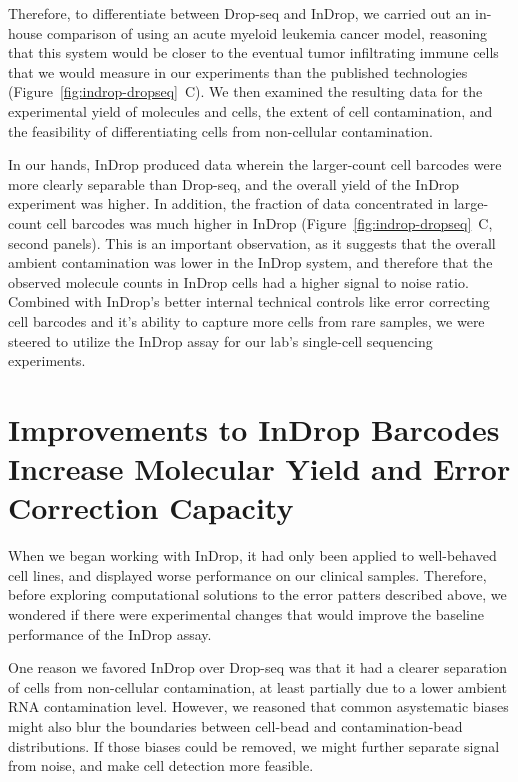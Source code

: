 Therefore, to differentiate between Drop-seq and InDrop, we carried out an in-house comparison of using an acute myeloid leukemia cancer model, reasoning that this system would be closer to the eventual tumor infiltrating immune cells that we would measure in our experiments than the published technologies (Figure~\ref{fig:indrop-dropseq}~C). 
We then examined the resulting data for the experimental yield of molecules and cells, the extent of cell contamination, and the feasibility of differentiating cells from non-cellular contamination. 

In our hands, InDrop produced data wherein the larger-count cell barcodes were more clearly separable than Drop-seq, and the overall yield of the InDrop experiment was higher.
In addition, the fraction of data concentrated in large-count cell barcodes was much higher in InDrop (Figure~\ref{fig:indrop-dropseq}~C, second panels). 
This is an important observation, as it suggests that the overall ambient contamination was lower in the InDrop system, and therefore that the observed molecule counts in InDrop cells had a higher signal to noise ratio. 
Combined with InDrop's better internal technical controls like error correcting cell barcodes and it's ability to capture more cells from rare samples, we were steered to utilize the InDrop assay for our lab's single-cell sequencing experiments.  

\section{Improvements to InDrop Barcodes Increase Molecular Yield and Error Correction Capacity}

When we began working with InDrop, it had only been applied to well-behaved cell lines, and displayed worse performance on our clinical samples. 
Therefore, before exploring computational solutions to the error patters described above, we wondered if there were experimental changes that would improve the baseline performance of the InDrop assay. 

One reason we favored InDrop over Drop-seq was that it had a clearer separation of cells from non-cellular contamination, at least partially due to a lower ambient RNA contamination level. 
However, we reasoned that common asystematic biases might also blur the boundaries between cell-bead and contamination-bead distributions. 
If those biases could be removed, we might further separate signal from noise, and make cell detection more feasible. 

